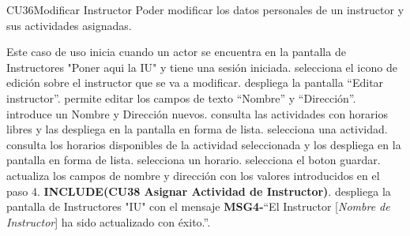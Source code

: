 
% 



	\begin{UseCase}{CU36}{Modificar Instructor}{
		Poder modificar los datos personales de un instructor y sus actividades asignadas.
	}
	\end{UseCase}
	\begin{UCtrayectoria}{Este caso de uso inicia cuando un actor se encuentra en la pantalla de Instructores "Poner aqui la IU" y tiene una sesión iniciada.}
		\UCpaso[\UCactor] selecciona el icono de edición sobre el instructor que se va a modificar.
		\UCpaso despliega la pantalla “Editar instructor”.
		\UCpaso permite editar los campos de texto “Nombre” y “Dirección”.
		\UCpaso[\UCactor] introduce un Nombre y Dirección nuevos.
		\UCpaso consulta las actividades con horarios libres y las despliega en la pantalla en forma de lista.
		\UCpaso[\UCactor] selecciona una actividad.
		\UCpaso consulta los horarios disponibles de la actividad seleccionada y los despliega en la pantalla en forma de lista.
		\UCpaso[\UCactor] selecciona un horario.
		\UCpaso[\UCactor] selecciona el boton guardar.
		\UCpaso actualiza los campos de nombre y dirección con los valores introducidos en el paso 4.
		\UCpaso \textbf{ INCLUDE(CU38 Asignar Actividad de Instructor)}.
		\UCpaso despliega la pantalla de Instructores "IU" con el mensaje {\bf MSG4-}``El Instructor [{\em Nombre de Instructor}] ha sido actualizado con éxito.''.
	\end{UCtrayectoria}

